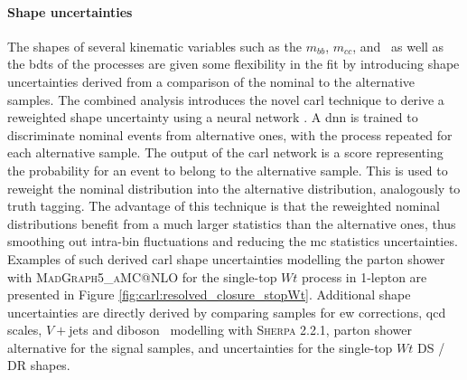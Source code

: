 \paragraph{Shape uncertainties} The shapes of several kinematic variables such as the $m_{bb}$, $m_{cc}$, and \ptv\ as well as the \glspl{bdt} of the processes are given some flexibility in the fit by introducing shape uncertainties derived from a comparison of the nominal to the alternative samples. The combined analysis introduces the novel \gls{carl} technique to derive a reweighted shape uncertainty using a neural network \cite{carl}. A \gls{dnn} is trained to discriminate nominal events from alternative ones, with the process repeated for each alternative sample. The output of the \gls{carl} network is a score representing the probability for an event to belong to the alternative sample. This is used to reweight the nominal distribution into the alternative distribution, analogously to truth tagging. The advantage of this technique is that the reweighted nominal distributions benefit from a much larger statistics than the alternative ones, thus smoothing out intra-bin fluctuations and reducing the \gls{mc} statistics uncertainties. Examples of such derived \gls{carl} shape uncertainties modelling the parton shower with \textsc{MadGraph5\_aMC@NLO} for the single-top $Wt$ process in 1-lepton are presented in Figure \ref{fig:carl:resolved_closure_stopWt}. Additional shape uncertainties are directly derived by comparing samples for \gls{ew} corrections, \gls{qcd} scales, $V+$jets and diboson \ptv\ modelling with \textsc{Sherpa} 2.2.1, parton shower alternative for the signal samples, and uncertainties for the single-top $Wt$ DS / DR shapes.

